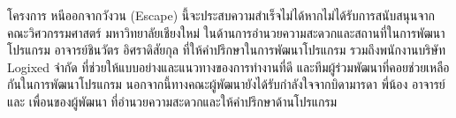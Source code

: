 \begin{acknowledgments}
โครงการ หนีออกจากวังวน (Escape) 
นี้จะประสบความสำเร็จไม่ได้หากไม่ได้รับการสนับสนุนจากคณะวิศวกรรมศาสตร์ มหาวิทยาลัยเชียงใหม่ 
ในด้านการอำนวยความสะดวกและสถานที่ในการพัฒนาโปรแกรม
อาจารย์ชินวัตร อิศราดิสัยกุล ที่ให้คำปรึกษาในการพัฒนาโปรแกรม
รวมถึงพนักงานบริษัท Logixed จำกัด ที่ช่วยให้แบบอย่างและแนวทางของการทำงานที่ดี
และทีมผู้ร่วมพัฒนาที่คอยช่วยเหลือกันในการพัฒนาโปรแกรม 
นอกจากนี้ทางคณะผู้พัฒนายังได้รับกำลังใจจากบิดามารดา พี่น้อง อาจารย์ และ
เพื่อนของผู้พัฒนา ที่อำนวยความสะดวกและให้คำปรึกษาด้านโปรแกรม 

\end{acknowledgments}%
\fi %

\contentspage

\ifproject
\figurelistpage

\tablelistpage
\fi %



